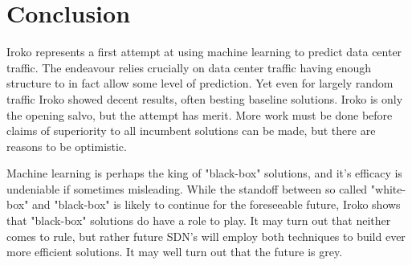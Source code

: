 \section{Conclusion}
\label{sec:conclusion}

Iroko represents a first attempt at using machine learning
to predict data center traffic. The endeavour relies crucially
on data center traffic having enough structure to in fact allow
some level of prediction. Yet even for largely random traffic
Iroko showed decent results, often besting baseline solutions.
Iroko is only the opening salvo, but the attempt has merit. 
More work must be done before claims of superiority to all
incumbent solutions can be made, but there are reasons to be
optimistic. 

Machine learning is perhaps the king of "black-box" solutions, 
and it's efficacy is undeniable if sometimes misleading. While
the standoff between so called "white-box" and "black-box" is 
likely to continue for the foreseeable future, Iroko shows
that "black-box" solutions do have a role to play. It may turn
out that neither comes to rule, but rather future SDN's will 
employ both techniques to build ever more efficient solutions.
It may well turn out that the future is grey.



